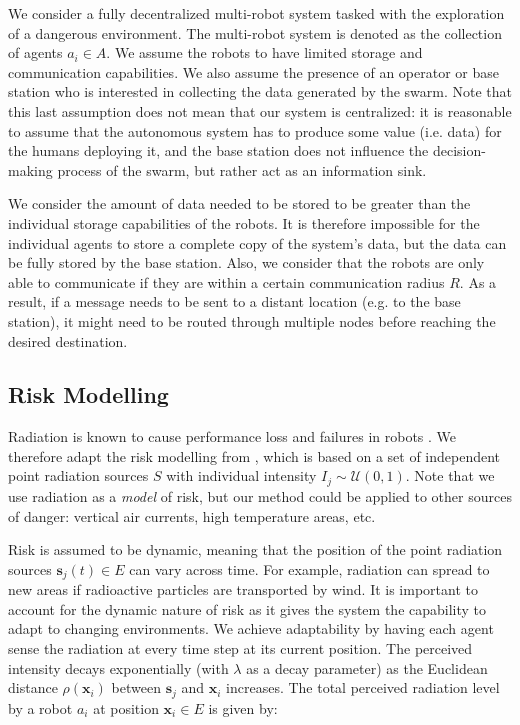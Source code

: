 We consider a fully decentralized multi-robot system tasked with the
exploration of a dangerous environment. The multi-robot system is denoted as the collection 
of agents $a_i \in A$. We assume the robots to have limited storage and communication 
capabilities. We also assume the presence of an operator or base station who is interested 
in collecting the data generated by the swarm. Note that this last assumption does not mean 
that our system is centralized: it is reasonable to assume that the autonomous system has 
to produce some value (i.e. data) for the humans deploying it, and the base station does 
not influence the decision-making process of the swarm, but rather act as an 
information sink.

We consider the amount of data needed to be stored to be greater than the individual 
storage capabilities of the robots. It is therefore impossible for the individual agents 
to store a complete copy of the system’s data, but the data can be fully stored by the 
base station. Also, we consider that the robots are only able to communicate if they are 
within a certain communication radius $R$. As a result, if a message needs to be sent to a 
distant location (e.g. to the base station), it might need to be routed through multiple 
nodes before reaching the desired destination.


\subsection{Risk Modelling}
Radiation is known to cause performance loss and failures in robots \cite{sharp1996radiation,messenger1986effects}. We therefore adapt the risk modelling from \cite{vielfaure2021dora}, which is based on a set of independent point radiation sources $S$ with individual intensity $I_j\sim\mathcal{U}(0, 1)$. Note that we use radiation as
a \emph{model} of risk, but our method could be applied to other sources of danger:
vertical air currents, high temperature areas, etc.

Risk is assumed to be dynamic, meaning that the position of the point radiation sources $\bm{s}_j(t) \in E$ can vary across time. 
For example, radiation can spread to new areas if radioactive particles are
transported by wind. It is important to account for the dynamic nature of risk as it gives 
the system the capability to adapt to changing environments. We achieve adaptability by 
having each agent sense the radiation at every time step at its current position. The 
perceived intensity decays exponentially (with $\lambda$ as a decay parameter) as the 
Euclidean distance $\rho(\bm{x}_i)$ between $\bm{s}_j$ and $\bm{x}_i$ increases. The
total perceived radiation level by a robot $a_i$ at position $\bm{x}_i \in E$ is given by:

